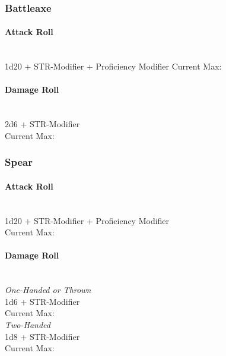 \documentclass[letterpaper,openany,oneside,twocolumn]{book}
\begin{document}
\subsubsection*{Battleaxe}
\paragraph*{Attack Roll} \hfill\\
1d20 + STR-Modifier + Proficiency Modifier
Current Max: 
\paragraph*{Damage Roll} \hfill\\
2d6 + STR-Modifier \\
Current Max: 
\subsubsection*{Spear}
\paragraph*{Attack Roll} \hfill\\
1d20 + STR-Modifier + Proficiency Modifier \\
Current Max: 
\paragraph*{Damage Roll} \hfill\\
\textit{One-Handed or Thrown} \\
1d6 + STR-Modifier \\
Current Max: \\
\textit{Two-Handed} \\
1d8 + STR-Modifier \\
Current Max: 
\end{document}
